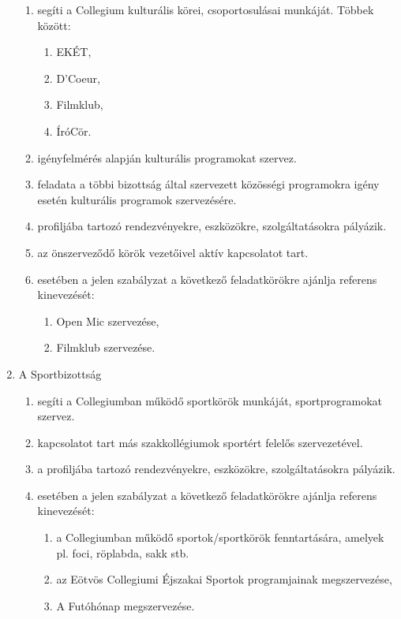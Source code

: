 \documentclass{../styles/rulebook}
\begin{document}
\begin{enumerate}
\begin{enumerate}
		\item segíti a Collegium kulturális körei, csoportosulásai munkáját. Többek között:
		\begin{enumerate}
			\item EKÉT,
			\item D’Coeur,
			\item Filmklub,
			\item ÍróCör.
		\end{enumerate}
		\item igényfelmérés alapján kulturális programokat szervez.
		\item feladata a többi bizottság által szervezett közösségi programokra igény esetén kulturális programok szervezésére.
		\item profiljába tartozó rendezvényekre, eszközökre, szolgáltatásokra pályázik.
		\item az önszerveződő körök vezetőivel aktív kapcsolatot tart.
		\item esetében a jelen szabályzat a következő feladatkörökre ajánlja referens kinevezését:
		\begin{enumerate}
			\item Open Mic szervezése,
			\item Filmklub szervezése.
		\end{enumerate}
	\end{enumerate}
	\item A Sportbizottság
	\begin{enumerate}
		\item segíti a Collegiumban működő sportkörök munkáját, sportprogramokat szervez.
		\item kapcsolatot tart más szakkollégiumok sportért felelős szervezetével.
		\item a profiljába tartozó rendezvényekre, eszközökre, szolgáltatásokra pályázik.
		\item esetében a jelen szabályzat a következő feladatkörökre ajánlja referens kinevezését:
		\begin{enumerate}
			\item a Collegiumban működő sportok/sportkörök fenntartására, amelyek pl. foci, röplabda, sakk stb.
			\item az Eötvös Collegiumi Éjszakai Sportok programjainak megszervezése,
			\item A Futóhónap megszervezése.
		\end{enumerate}
	\end{enumerate}
\end{enumerate}
\end{document}
